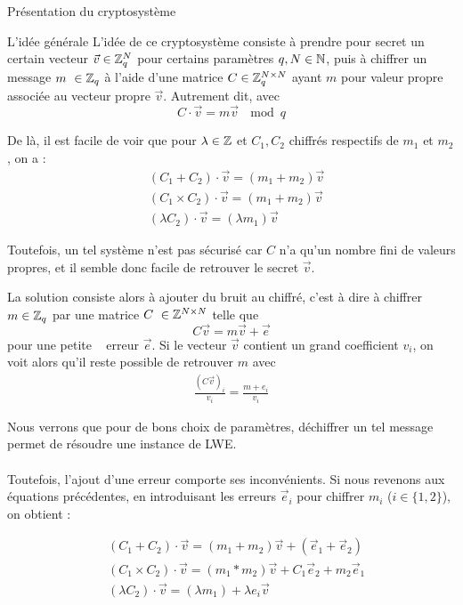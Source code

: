 \begin{section}{Présentation du cryptosystème}
	\begin{subsection}{L'idée générale}
	L'idée de ce cryptosystème consiste à prendre pour secret un certain vecteur $\vec{v} \in \mathbb{Z}_q^N$ pour certains paramètres $q, N \in \mathbb{N}$, puis à chiffrer un message $m \in \ZZq$ à l'aide d'une matrice $C \in \mathbb{Z}_q^{N \times N}$ ayant $m$ pour valeur propre associée au vecteur propre $\vec{v}$. Autrement dit, avec
\[C \cdot \vec{v} = m \vec{v}\: \mod q \]

	De là, il est facile de voir que pour $\lambda \in \mathbb{Z}$ et  $C_1, C_2$ chiffrés respectifs de $m_1$ et $m_2$, on a :
	\begin{align*}
	& (C_1 + C_2) \cdot \vec{v} = (m_1 + m_2) \vec{v} \\
	& (C_1 \times C_2) \cdot \vec{v} = (m_1 + m_2) \vec{v} \\
	& (\lambda  C_2) \cdot \vec{v} = (\lambda m_1) \vec{v} 
	\end{align*}

	Toutefois, un tel système n'est pas sécurisé car $C$ n'a qu'un nombre fini de valeurs propres, et il semble donc facile de retrouver le secret $\vec{v}$.

	La solution consiste alors à ajouter du bruit au chiffré, c'est à dire à chiffrer $m\in \ZZq$ par une matrice $C \in \ZZ^{N \times N}$ telle que 
	\[ C \vec{v} = m \vec{v} + \vec{e} \]
	pour une \og petite \fg~ erreur $\vec{e}$. Si le vecteur $\vec{v}$ contient un grand coefficient $v_i$, on voit alors qu'il reste possible de retrouver $m$ avec
	\begin{align*}
	\frac{{(C \vec{v})}_i}{v_i} = \frac{m + e_i}{v_i}
	\end{align*}
	
	Nous verrons que pour de bons choix de paramètres, déchiffrer un tel message permet de résoudre une instance de LWE.

\paragraph{}
	Toutefois, l'ajout d'une erreur comporte ses inconvénients. Si nous revenons aux équations précédentes, en introduisant les erreurs $\vec{e}_i$ pour chiffrer  $m_i$ ($i\in \{1,2\}$), on obtient :

	\begin{align*}
	& (C_1 + C_2) \cdot \vec{v} = (m_1 + m_2) \vec{v} + (\vec{e}_1 + \vec{e}_2)\\
	& (C_1 \times C_2) \cdot \vec{v} = (m_1 * m_2) \vec{v} + C_1 \vec{e}_2 + m_2\vec{e}_1 \\
	& (\lambda  C_2) \cdot \vec{v} = (\lambda m_1) + \lambda e_i\vec{v} 
	\end{align*}


\end{subsection}
\end{section}
